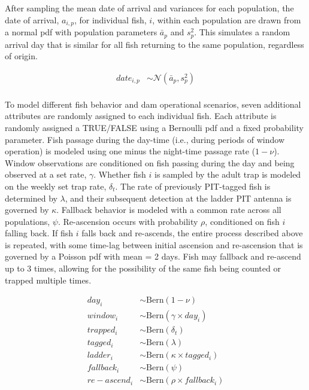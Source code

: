 \documentclass[
  12pt,
]{article}
\begin{document}
After sampling the mean date of arrival and variances for each population, the date of arrival, \(a_{i,p}\), for individual fish, \(i\), within each population are drawn from a normal pdf with population parameters \(\bar{a}_p\) and \(s^2_p\). This simulates a random arrival day that is similar for all fish returning to the same population, regardless of origin.

\[
\begin{aligned}
 date_{i,p} &\sim \mathcal{N}(\bar{a}_p, s^2_p) \\
\end{aligned}
\]

To model different fish behavior and dam operational scenarios, seven additional attributes are randomly assigned to each individual fish. Each attribute is randomly assigned a TRUE/FALSE using a Bernoulli pdf and a fixed probability parameter. Fish passage during the day-time (i.e., during periods of window operation) is modeled using one minus the night-time passage rate (\(1 - \nu\)). Window observations are conditioned on fish passing during the day and being observed at a set rate, \(\gamma\). Whether fish \(i\) is sampled by the adult trap is modeled on the weekly set trap rate, \(\delta_t\). The rate of previously PIT-tagged fish is determined by \(\lambda\), and their subsequent detection at the ladder PIT antenna is governed by \(\kappa\). Fallback behavior is modeled with a common rate across all populations, \(\psi\). Re-ascension occurs with probability \(\rho\), conditioned on fish \(i\) falling back. If fish \(i\) falls back and re-ascends, the entire process described above is repeated, with some time-lag between initial ascension and re-ascension that is governed by a Poisson pdf with mean = 2 days. Fish may fallback and re-ascend up to 3 times, allowing for the possibility of the same fish being counted or trapped multiple times.

\[
\begin{aligned}
  day_{i} &\sim \text{Bern}(1-\nu) \\
  window_{i} &\sim \text{Bern}(\gamma \times day_i) \\
  trapped_{i} &\sim \text{Bern}(\delta_t) \\
  tagged_{i} &\sim \text{Bern}(\lambda) \\
  ladder_{i} &\sim \text{Bern}(\kappa \times tagged_i) \\  
  fallback_{i} &\sim \text{Bern}(\psi) \\
  re-ascend_{i} &\sim \text{Bern}(\rho \times fallback_i)
\end{aligned}
\]
\end{document}
